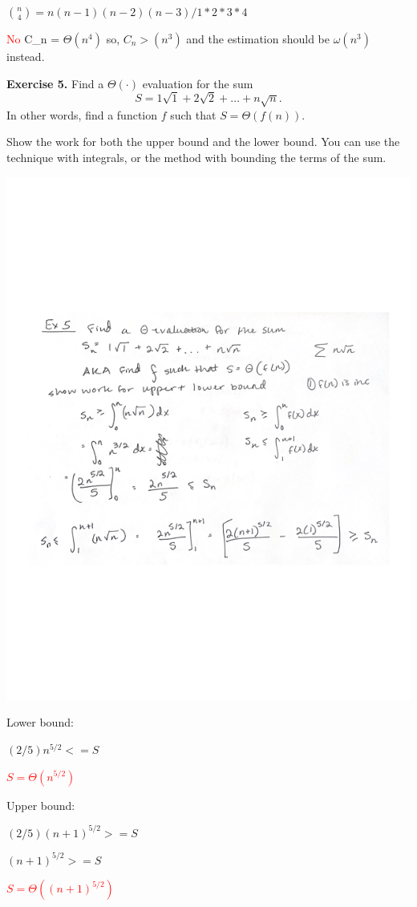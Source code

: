 \documentclass[11pt]{article}
\begin{document}
$\binom{n}{4} = n(n-1)(n-2)(n-3)/1 * 2 * 3 * 4$
\medskip

\textcolor{red}{No}
C_n = $\Theta(n^4)$ so, $C_n > (n^3)$ and the estimation should be $\omega(n^3)$ instead.
\bigskip
\bigskip

\textbf{Exercise 5.}
Find a $\Theta(\cdot)$ evaluation for the sum
\[
S = 1\sqrt{1} + 2 \sqrt{2} + \ldots + n \sqrt{n}.
\]
In other words, find a function $f$ such that $S = \Theta(f(n))$.
\medskip

Show the work for both the upper bound and the lower bound. You can use the technique with integrals, or the  method with bounding the terms of the sum.

\includegraphics[scale=0.75]{ex5.png}

Lower bound:

$(2/5)n^{5/2} <= S$

\textcolor{red}{$S = \Theta(n^{5/2})$}

\bigskip Upper bound:

\smallskip$(2/5)(n+1)^{5/2} >= S$

$(n+1)^{5/2} >= S$

\smallskip\textcolor{red}{$S = \Theta((n+1)^{5/2})$}
\end{document}
